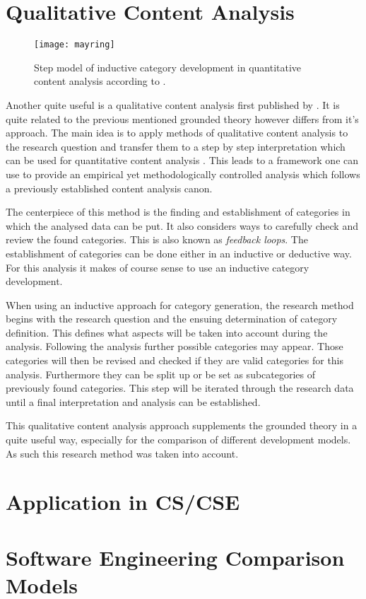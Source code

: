 \section{Qualitative Content Analysis} %
\label{sec:Mayring}

\begin{figure}[htbp]
  \centering
  \texttt{[image: mayring]}
  \caption{Step model of inductive category development in quantitative content
    analysis according to \citeauthor{Mayring2008} \cite{Mayring2000,Mayring2008}.}
\end{figure}

Another quite useful is a qualitative content analysis first published by
\textcite{Mayring2008}. It is quite related to the previous mentioned grounded
theory however differs from it's approach. The main idea is to apply methods of
qualitative content analysis to the research question and transfer them to a
step by step interpretation which can be used for quantitative content analysis
\cite{Mayring2000}. This leads to a framework one can use to provide an
empirical yet methodologically controlled analysis which follows a previously
established content analysis canon.

The centerpiece of this method is the finding and establishment of categories
in which the analysed data can be put. It also considers ways to carefully
check and review the found categories. This is also known as \emph{feedback
loops}. The establishment of categories can be done either in an inductive or
deductive way. For this analysis it makes of course sense to use an inductive
category development.

When using an inductive approach for category generation, the research method
begins with the research question and the ensuing determination of category
definition. This defines what aspects will be taken into account during the
analysis. Following the analysis further possible categories may appear. Those
categories will then be revised and checked if they are valid categories for
this analysis. Furthermore they can be split up or be set as subcategories of
previously found categories. This step will be iterated through the research
data until a final interpretation and analysis can be established.

This qualitative content analysis approach supplements the grounded theory in a
quite useful way, especially for the comparison of different development
models. As such this research method was taken into account.


\section{Application in CS/CSE} %
\label{sec:Application in CS/CSE}


\section{Software Engineering Comparison Models} %



